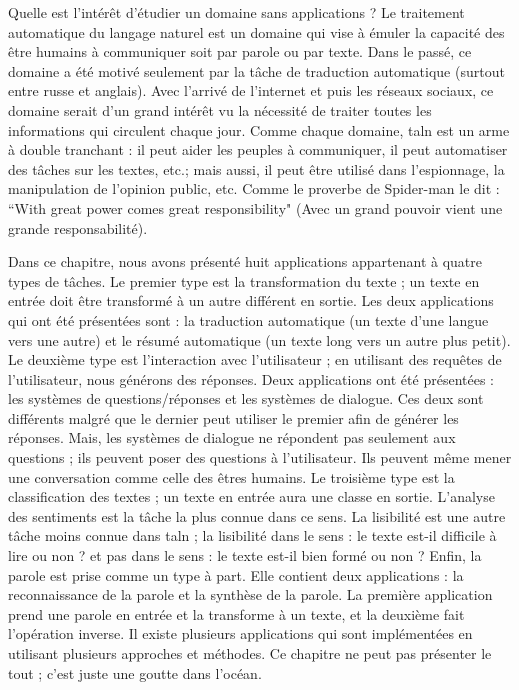 \documentclass{KodeBook}
\begin{document}
Quelle est l'intérêt d'étudier un domaine sans applications ? 
Le traitement automatique du langage naturel est un domaine qui vise à émuler la capacité des être humains à communiquer soit par parole ou par texte. 
Dans le passé, ce domaine a été motivé seulement par la tâche de traduction automatique (surtout entre russe et anglais). 
Avec l'arrivé de l'internet et puis les réseaux sociaux, ce domaine serait d'un grand intérêt vu la nécessité de traiter toutes les informations qui circulent chaque jour. 
Comme chaque domaine, \ac{taln} est un arme à double tranchant : il peut aider les peuples à communiquer, il peut automatiser des tâches sur les textes, etc.; mais aussi, il peut être utilisé dans l'espionnage, la manipulation de l'opinion public, etc. 
Comme le proverbe de Spider-man le dit : ``With great power comes great responsibility" (Avec un grand pouvoir vient une grande responsabilité). 

Dans ce chapitre, nous avons présenté huit applications appartenant à quatre types de tâches. 
Le premier type est la transformation du texte ; un texte en entrée doit être transformé à un autre différent en sortie. 
Les deux applications qui ont été présentées sont : la traduction automatique (un texte d'une langue vers une autre) et le résumé automatique (un texte long vers un autre plus petit). 
Le deuxième type est l'interaction avec l'utilisateur ; en utilisant des requêtes de l'utilisateur, nous générons des réponses. 
Deux applications ont été présentées : les systèmes de questions/réponses et les systèmes de dialogue.
Ces deux sont différents malgré que le dernier peut utiliser le premier afin de générer les réponses. 
Mais, les systèmes de dialogue ne répondent pas seulement aux questions ; ils peuvent poser des questions à l'utilisateur.
Ils peuvent même mener une conversation comme celle des êtres humains. 
Le troisième type est la classification des textes ; un texte en entrée aura une classe en sortie. 
L'analyse des sentiments est la tâche la plus connue dans ce sens.
La lisibilité est une autre tâche moins connue dans \ac{taln} ; la lisibilité dans le sens : le texte est-il difficile à lire ou non ? et pas dans le sens : le texte est-il bien formé ou non ?
Enfin, la parole est prise comme un type à part. 
Elle contient deux applications : la reconnaissance de la parole et la synthèse de la parole. 
La première application prend une parole en entrée et la transforme à un texte, et la deuxième fait l'opération inverse.
Il existe plusieurs applications qui sont implémentées en utilisant plusieurs approches et méthodes. 
Ce chapitre ne peut pas présenter le tout ; c'est juste une goutte dans l'océan.
\end{document}
